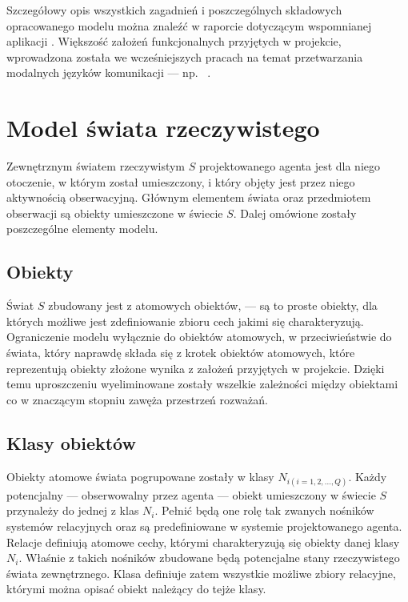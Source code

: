Szczegółowy opis wszystkich zagadnień i poszczególnych składowych opracowanego modelu można znaleźć w raporcie dotyczącym wspomnianej aplikacji \cite{raport}. Większość założeń funkcjonalnych przyjętych w projekcie, wprowadzona została we wcześniejszych pracach na temat przetwarzania modalnych języków komunikacji --- np.\ \cite{kat99} \cite{kat07}.


\section{Model świata rzeczywistego}

Zewnętrznym światem rzeczywistym $ S $ projektowanego agenta jest dla niego otoczenie, w którym został umieszczony, i który objęty jest przez niego aktywnością obserwacyjną. Głównym elementem świata oraz przedmiotem obserwacji są obiekty umieszczone w świecie $ S $. Dalej omówione zostały poszczególne elementy modelu.


	\subsection{Obiekty}
	
	Świat $ S $ zbudowany jest z atomowych obiektów, --- są to proste obiekty, dla których możliwe jest zdefiniowanie zbioru cech jakimi się charakteryzują. Ograniczenie modelu wyłącznie do obiektów atomowych, w przeciwieństwie do świata, który naprawdę składa się z krotek obiektów atomowych, które reprezentują obiekty złożone wynika z założeń przyjętych w projekcie. Dzięki temu uproszczeniu wyeliminowane zostały wszelkie zależności między obiektami co w znaczącym stopniu zawęża przestrzeń rozważań.
	
	
	\subsection{Klasy obiektów}
	
	Obiekty atomowe świata pogrupowane zostały w klasy $ N_{i(i=1,2,...,Q)} $. Każdy potencjalny --- obserwowalny przez agenta --- obiekt umieszczony w świecie $ S $ przynależy do jednej z klas $ N_i $. Pełnić będą one rolę tak zwanych nośników systemów relacyjnych oraz są predefiniowane w systemie projektowanego agenta. Relacje definiują atomowe cechy, którymi charakteryzują się obiekty danej klasy $ N_i $. Właśnie z takich nośników zbudowane będą potencjalne stany rzeczywistego świata zewnętrznego. Klasa definiuje zatem wszystkie możliwe zbiory relacyjne, którymi można opisać obiekt należący do tejże klasy.
	
